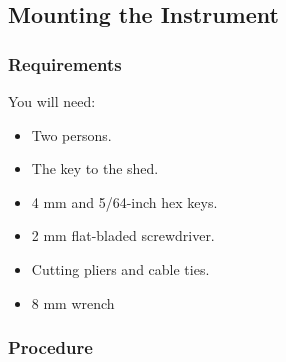\subsection{Mounting the Instrument}
\label{section:mounting-the-instrument}

\subsubsection{Requirements}

You will need:

\begin{itemize}
    \item Two persons.
    \item The key to the shed.
    \item 4 mm and 5/64-inch hex keys.
    \item 2 mm flat-bladed screwdriver.
    \item Cutting pliers and cable ties.
    \item 8 mm wrench
\end{itemize}

\subsubsection{Procedure}

